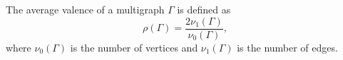The average valence of a multigraph $\Gamma$ is defined as
$$\rho(\Gamma) = \frac{2\nu_1(\Gamma)}{\nu_0(\Gamma)},$$
where $\nu_0(\Gamma)$ is the number of vertices and $\nu_1(\Gamma)$ is the number of edges.
